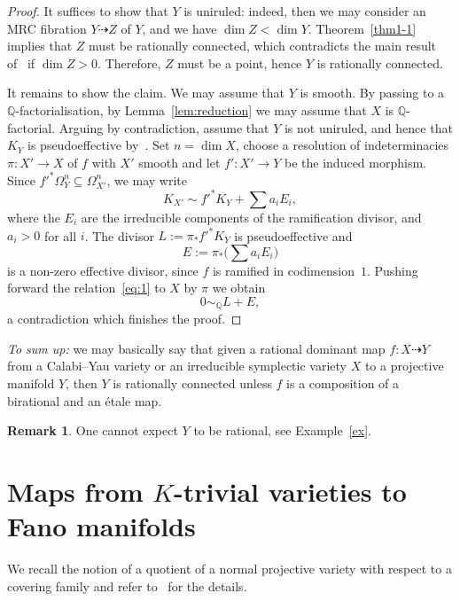 \documentclass[11pt]{article}
\theoremstyle{definition}
\newtheorem{rema}[theo]{Remark}
\numberwithin{equation}{section}
\numberwithin{figure}{section}
\numberwithin{table}{section}
\newcommand{\Qbb}{\mathbb{Q}} %
\begin{document}
\begin{proof}
It suffices to show that $Y$ is uniruled: indeed, then we may consider an MRC fibration $Y\dashrightarrow Z$ of $Y$, and we have $\dim Z<\dim Y$. Theorem~\ref{thm1-1} implies that $Z$ must be rationally connected, which contradicts the main result of~\cite{GHS03} if $\dim Z>0$. Therefore, $Z$ must be a point, hence $Y$ is rationally connected.

It remains to show the claim. We may assume that $Y$ is smooth. By passing to a $\Qbb$-factorialisation, by Lemma~\ref{lem:reduction} we may assume that $X$ is $\Qbb$-factorial. Arguing by contradiction, assume that $Y$ is not uniruled, and hence that $K_Y$ is pseudoeffective by~\cite[Corollary~0.3]{BDPP}. Set $n = \dim X$, choose a resolution of indeterminacies $\pi\colon X' \to X$ of $f$ with $X'$ smooth and let $f'\colon X' \to Y$ be the induced morphism. Since $f'^*\Omega^n_Y \subseteq \Omega^n_{X'}$, we may write
\begin{equation}\label{eq:1}
K_{X'} \sim f'^*K_Y + \sum a_i E_i,
\end{equation}
where the $E_i $ are the irreducible components of the ramification divisor, and $a_i>0$ for all $i$. The divisor $L := \pi_*f'^*K_Y $ is pseudoeffective and
\[
E:=\pi_*\big(\sum a_i E_i\big)
\]
is a non-zero effective divisor, since $f$ is ramified in codimension~$1$. Pushing forward the relation~\eqref{eq:1} to $X$ by $\pi$ we obtain
\[
0 \sim_\Qbb L + E,
\]
a contradiction which finishes the proof.
\end{proof}

\emph{To sum up:} we may basically say that given a rational dominant map $f\colon X \dasharrow Y $ from a Calabi--Yau variety or an irreducible symplectic variety $X$ to a projective manifold $Y$, then $Y$ is rationally connected unless $f$ is a composition of a birational and an étale map.

\begin{rema}\label{rema:main3.5}
One cannot expect $Y$ to be rational, see Example~\ref{ex}.
\end{rema}

\section{Maps from \texorpdfstring{$K$}{K}-trivial varieties to Fano manifolds}\label{sect-4}

We recall the notion of a quotient of a normal projective variety with respect to a covering family and refer to~\cite{Ca81,Ca04,BCE+} for the details.
\end{document}
